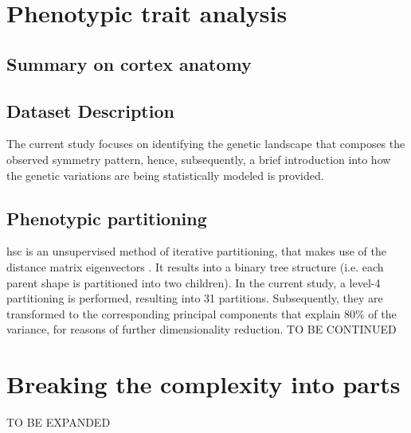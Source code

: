 \section{Phenotypic trait analysis}\label{sec:phenotype_intro}
\subsection{Summary on cortex anatomy}
 
\subsection{Dataset Description}
 

The current study focuses on identifying the genetic landscape that composes the observed symmetry pattern, hence, subsequently, a brief introduction into how the genetic variations are being statistically modeled is provided.




\citet{Sha2021}


\subsection{Phenotypic partitioning}\label{sec:hsc}
\Acf{hsc} is an unsupervised method of iterative partitioning, that makes use of the distance matrix eigenvectors \cite{Ng2002}. It results into a binary tree structure (i.e. each parent shape is partitioned into two children). In the current study, a level-4 partitioning is performed, resulting into 31 partitions. Subsequently, they are transformed to the corresponding principal components that explain 80\% of the variance, for reasons of further dimensionality reduction. TO BE CONTINUED




\section{Breaking the complexity into parts}
TO BE EXPANDED

